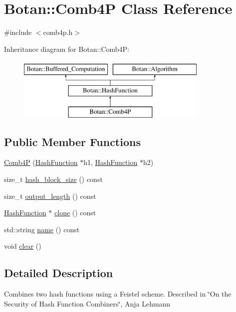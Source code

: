 \hypertarget{classBotan_1_1Comb4P}{\section{Botan\-:\-:Comb4\-P Class Reference}
\label{classBotan_1_1Comb4P}
}


{\ttfamily \#include $<$comb4p.\-h$>$}

Inheritance diagram for Botan\-:\-:Comb4\-P\-:\begin{figure}[H]
\begin{center}
\leavevmode
\includegraphics[height=3.000000cm]{classBotan_1_1Comb4P}
\end{center}
\end{figure}
\subsection*{Public Member Functions}
\begin{DoxyCompactItemize}
\item 
\hyperlink{classBotan_1_1Comb4P_a4951145ded6d173e2d4cefe8ac96ff09}{Comb4\-P} (\hyperlink{classBotan_1_1HashFunction}{Hash\-Function} $\ast$h1, \hyperlink{classBotan_1_1HashFunction}{Hash\-Function} $\ast$h2)
\item 
size\-\_\-t \hyperlink{classBotan_1_1Comb4P_ac532c8612908ba299222e628f4c12ab7}{hash\-\_\-block\-\_\-size} () const 
\item 
size\-\_\-t \hyperlink{classBotan_1_1Comb4P_ae594f9cf1e331b5df1451664001bdce1}{output\-\_\-length} () const 
\item 
\hyperlink{classBotan_1_1HashFunction}{Hash\-Function} $\ast$ \hyperlink{classBotan_1_1Comb4P_aa3bba25b9b37e6c553bf24ec1ac03239}{clone} () const 
\item 
std\-::string \hyperlink{classBotan_1_1Comb4P_a245d3dd9c5ac55eed7b5a0f7e8794c33}{name} () const 
\item 
void \hyperlink{classBotan_1_1Comb4P_ae9fd424ddd6a8d9bb1d1a7047a2e9009}{clear} ()
\end{DoxyCompactItemize}


\subsection{Detailed Description}
Combines two hash functions using a Feistel scheme. Described in \char`\"{}\-On the Security of Hash Function Combiners\char`\"{}, Anja Lehmann 

